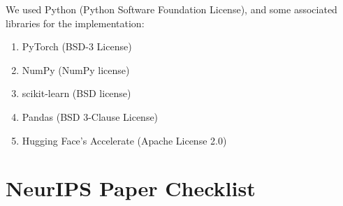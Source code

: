 \documentclass{article}
\begin{document}
We used Python (Python Software Foundation License), and some associated libraries for the implementation:
\begin{enumerate}
    \item PyTorch (BSD-3 License)
    \item NumPy (NumPy license)
    \item scikit-learn (BSD license)
    \item Pandas (BSD 3-Clause License)
    \item Hugging Face's Accelerate (Apache License 2.0)
\end{enumerate}




\newpage
\section*{NeurIPS Paper Checklist}
\end{document}
